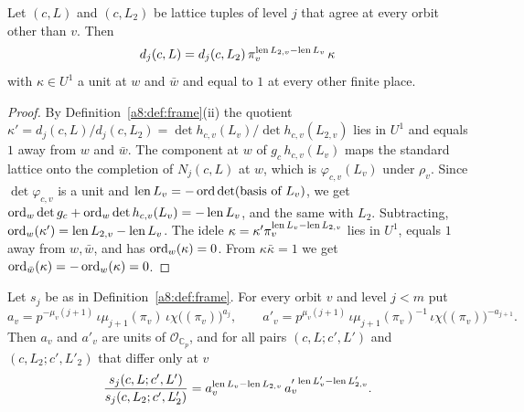 \begin{lemma}\label{a8:lem:det}
Let $(c,L)$ and $(c,L_2)$ be lattice tuples of level $j$ that agree at every orbit other than $v$. Then
\[
d_j(c,L)=d_j(c,L_2)\,\pi_v^{\operatorname{len} L_{2,v}-\operatorname{len} L_v}\,\kappa
\]
with $\kappa\in U^1$ a unit at $w$ and $\bar w$ and equal to $1$ at every other finite place.
\end{lemma}

\begin{proof}
By Definition~\ref{a8:def:frame}(ii) the quotient $\kappa'=d_j(c,L)/d_j(c,L_2)=\det h_{c,v}(L_v)/\det h_{c,v}(L_{2,v})$ lies in $U^1$ and equals $1$ away from $w$ and $\bar w$. The component at $w$ of $g_c\,h_{c,v}(L_v)$ maps the standard lattice onto the completion of $N_j(c,L)$ at $w$, which is $\varphi_{c,v}(L_v)$ under $\rho_v$. Since $\det\varphi_{c,v}$ is a unit and $\operatorname{len} L_v=-\operatorname{ord}\det(\text{basis of }L_v)$, we get $\operatorname{ord}_w\det g_c+\operatorname{ord}_w\det h_{c,v}(L_v)=-\operatorname{len} L_v$, and the same with $L_2$. Subtracting, $\operatorname{ord}_w(\kappa')=\operatorname{len} L_{2,v}-\operatorname{len} L_v$. The idele $\kappa=\kappa'\pi_v^{\operatorname{len} L_v-\operatorname{len} L_{2,v}}$ lies in $U^1$, equals $1$ away from $w,\bar w$, and has $\operatorname{ord}_w(\kappa)=0$. From $\kappa\bar\kappa=1$ we get $\operatorname{ord}_{\bar w}(\kappa)=-\operatorname{ord}_w(\kappa)=0$.
\end{proof}

\begin{proposition}[(N1)]\label{a8:prop:N1}
Let $s_j$ be as in Definition~\ref{a8:def:frame}. For every orbit $v$ and level $j<m$ put
\[
a_v=p^{-\mu_v(j+1)}\,\iota\mu_{j+1}(\pi_v)\,\iota\chi\big((\pi_v)\big)^{a_j},\qquad a'_v=p^{\mu_v(j+1)}\,\iota\mu_{j+1}(\pi_v)^{-1}\,\iota\chi\big((\pi_v)\big)^{-a_{j+1}}.
\]
Then $a_v$ and $a'_v$ are units of $\mathcal O_{\mathbb C_p}$, and for all pairs $(c,L;c',L')$ and $(c,L_2;c',L'_2)$ that differ only at $v$
\[
\frac{s_j(c,L;c',L')}{s_j(c,L_2;c',L'_2)}=a_v^{\operatorname{len} L_v-\operatorname{len} L_{2,v}}\,a_v'^{\,\operatorname{len} L'_v-\operatorname{len} L'_{2,v}} .
\]
\end{proposition}

